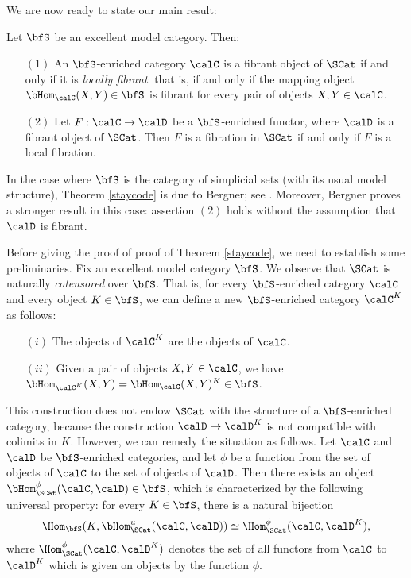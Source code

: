 \begin{Simplicial Categories}
We are now ready to state our main result:

\begin{theorem}\label{staycode}
Let $\bfS$ be an excellent model category.
Then:
\begin{itemize}
\item[$(1)$] An $\bfS$-enriched category $\calC$ is a fibrant object of $\SCat$ if and only if it is {\em locally fibrant}: that is, if and only if the mapping object $\bHom_{\calC}(X,Y) \in \bfS$ is fibrant for
every pair of objects $X,Y \in \calC$. 
\item[$(2)$] Let $F: \calC \rightarrow \calD$ be a $\bfS$-enriched functor, where $\calD$ is a
fibrant object of $\SCat$. Then $F$ is a fibration in $\SCat$ if and only if $F$ is a local fibration.
\end{itemize}
\end{theorem}

\begin{remark}
In the case where $\bfS$ is the category of simplicial sets (with its usual model structure),
Theorem \ref{staycode} is due to Bergner; see \cite{bergner}. Moreover, Bergner
proves a stronger result in this case: assertion $(2)$ holds without the assumption that
$\calD$ is fibrant.
\end{remark}

Before giving the proof of proof of Theorem \ref{staycode}, we need to establish some preliminaries.
Fix an excellent model category $\bfS$. We observe
that $\SCat$ is naturally {\em cotensored} over $\bfS$. That is, for
every $\bfS$-enriched category $\calC$ and every object $K \in \bfS$, we can define a new $\bfS$-enriched category $\calC^{K}$ as follows:

\begin{itemize}
\item[$(i)$] The objects of $\calC^{K}$ are the objects of $\calC$.
\item[$(ii)$] Given a pair of objects $X,Y \in \calC$, we have
$\bHom_{\calC^{K}}(X,Y) = \bHom_{\calC}(X,Y)^{K} \in \bfS$. 
\end{itemize} 

This construction does not endow $\SCat$ with the structure of a $\bfS$-enriched category, because
the construction $\calD \mapsto \calD^{K}$ is not compatible with colimits in $K$. However,
we can remedy the situation as follows. Let $\calC$ and $\calD$ be $\bfS$-enriched categories,
and let $\phi$ be a function from the set of objects of $\calC$ to the set of objects of $\calD$. Then
there exists an object $\bHom_{\SCat}^{\phi}( \calC, \calD) \in \bfS$, which is characterized by the following universal property: for every $K \in \bfS$, there is a natural bijection
$$ \Hom_{\bfS}(K, \bHom_{\SCat}^{u}(\calC, \calD) ) \simeq \Hom^{\phi}_{\SCat}(\calC, \calD^{K} ),$$
where $\Hom^{\phi}_{\SCat}(\calC, \calD^{K} )$ denotes the set of all functors from
$\calC$ to $\calD^{K}$ which is given on objects by the function $\phi$.


\end{Simplicial Categories}
